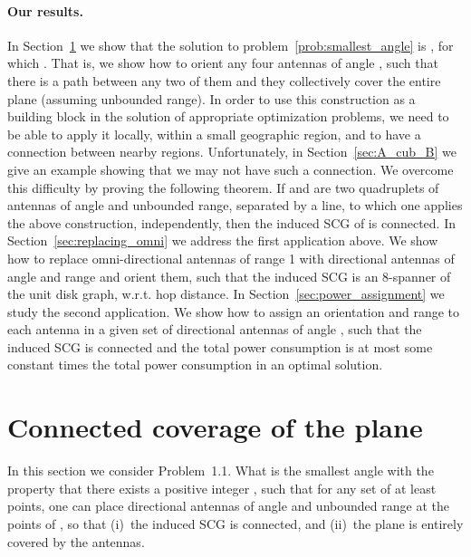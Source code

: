 \documentclass[11pt,letter]{article}
\begin{document}
\paragraph{Our results.}
In Section~\ref{sec:connected_coverage} we show that the solution to problem~\ref{prob:smallest_angle} is , for which . That is, we show how to orient any four antennas of angle , such that there is a path between any two of them and they collectively cover the entire plane (assuming unbounded range).
In order to use this construction as a building block in the solution of appropriate optimization problems, we need to be able to apply it locally, within a small geographic region, and to have a connection between nearby regions. Unfortunately, in Section~\ref{sec:A_cub_B} we give an example showing that we may not have such a connection. We overcome this difficulty by proving the following theorem. If  and  are two quadruplets of
antennas of angle  and unbounded range, separated by a line, to which one applies the above construction, independently, then
the induced SCG of  is connected.
In Section~\ref{sec:replacing_omni} we address the first application above. We show how to replace omni-directional antennas of range 1 with directional antennas of angle  and range  and orient them, such that the induced SCG is an 8-spanner of the unit disk graph, w.r.t. hop distance.
In Section~\ref{sec:power_assignment} we study the second application. We show how to assign an orientation and range to each antenna in a given set of directional antennas of angle , such that the induced SCG is connected and the total power consumption is at most some constant times the total power consumption in an optimal solution.
























\section{Connected coverage of the plane}\label{sec:connected_coverage}


In this section we consider Problem~1.1.
What is the smallest angle  with the property that there exists a positive integer ,
such that for any set  of at least  points,
one can place directional antennas of angle  and unbounded range at the points of , so that
(i)~the induced SCG is connected,
and (ii)~the plane is entirely covered by the antennas.
\end{document}
